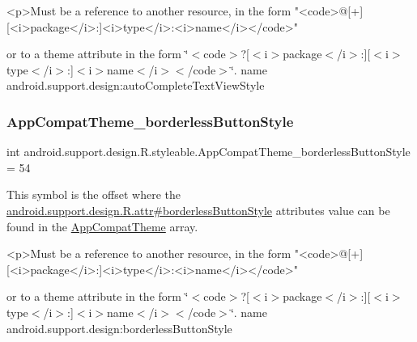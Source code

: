 \begin{DoxyVerb}      <p>Must be a reference to another resource, in the form "<code>@[+][<i>package</i>:]<i>type</i>:<i>name</i></code>"
\end{DoxyVerb}
 or to a theme attribute in the form \char`\"{}$<$code$>$?\mbox{[}$<$i$>$package$<$/i$>$\+:\mbox{]}\mbox{[}$<$i$>$type$<$/i$>$\+:\mbox{]}$<$i$>$name$<$/i$>$$<$/code$>$\char`\"{}.  name android.\+support.\+design\+:auto\+Complete\+Text\+View\+Style \mbox{\label{classandroid_1_1support_1_1design_1_1R_1_1styleable_a51f25c97407bb9f72b8b17f1681d354c}} 
\subsubsection{\texorpdfstring{App\+Compat\+Theme\+\_\+borderless\+Button\+Style}{AppCompatTheme\_borderlessButtonStyle}}
{\footnotesize\ttfamily int android.\+support.\+design.\+R.\+styleable.\+App\+Compat\+Theme\+\_\+borderless\+Button\+Style = 54\hspace{0.3cm}{\ttfamily [static]}}

This symbol is the offset where the \hyperlink{classandroid_1_1support_1_1design_1_1R_1_1attr_ace596a46988f2ff961b6fb676b7ddf15}{android.\+support.\+design.\+R.\+attr\#borderless\+Button\+Style} attribute\textquotesingle{}s value can be found in the \hyperlink{classandroid_1_1support_1_1design_1_1R_1_1styleable_afb351dc8de20cbd4c89abe360373010c}{App\+Compat\+Theme} array.

\begin{DoxyVerb}      <p>Must be a reference to another resource, in the form "<code>@[+][<i>package</i>:]<i>type</i>:<i>name</i></code>"
\end{DoxyVerb}
 or to a theme attribute in the form \char`\"{}$<$code$>$?\mbox{[}$<$i$>$package$<$/i$>$\+:\mbox{]}\mbox{[}$<$i$>$type$<$/i$>$\+:\mbox{]}$<$i$>$name$<$/i$>$$<$/code$>$\char`\"{}.  name android.\+support.\+design\+:borderless\+Button\+Style \mbox{\label{classandroid_1_1support_1_1design_1_1R_1_1styleable_af8735dbd6db5ad3231c6574488067693}} 
